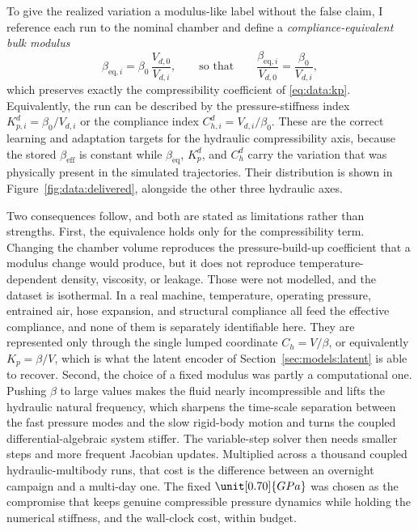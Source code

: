 To give the realized variation a modulus-like label without the false
claim, I reference each run to the nominal chamber and define a
\emph{compliance-equivalent bulk modulus}
%
\begin{equation}
  \label{eq:data:betaeq}
  \beta_{\mathrm{eq},i} = \beta_0\,\frac{V_{d,0}}{V_{d,i}},
  \qquad\text{so that}\qquad
  \frac{\beta_{\mathrm{eq},i}}{V_{d,0}} = \frac{\beta_0}{V_{d,i}},
\end{equation}
%
which preserves exactly the compressibility coefficient of
\eqref{eq:data:kp}. Equivalently, the run can be described by the
pressure-stiffness index $K_{p,i}^{d} = \beta_0/V_{d,i}$ or the
compliance index $C_{h,i}^{d} = V_{d,i}/\beta_0$. These are the correct
learning and adaptation targets for the hydraulic compressibility axis, because the stored $\beta_{\mathrm{eff}}$ is constant while
$\beta_{\mathrm{eq}}$, $K_p^{d}$, and $C_h^{d}$ carry the variation that
was physically present in the simulated trajectories. Their distribution
is shown in Figure~\ref{fig:data:delivered}, alongside the other three
hydraulic axes.

Two consequences follow, and both are stated as limitations rather than
strengths. First, the equivalence holds only for the compressibility
term. Changing the chamber volume reproduces the pressure-build-up
coefficient that a modulus change would produce, but it does not
reproduce temperature-dependent density, viscosity, or leakage. Those
were not modelled, and the dataset is isothermal. In a real machine,
temperature, operating pressure, entrained air, hose expansion, and
structural compliance all feed the effective compliance, and none of
them is separately identifiable here. They are represented only through
the single lumped coordinate $C_h = V/\beta$, or equivalently
$K_p = \beta/V$, which is what the latent encoder of
Section~\ref{sec:models:latent} is able to recover. Second, the choice
of a fixed modulus was partly a computational one. Pushing $\beta$ to
large values makes the fluid nearly incompressible and lifts the
hydraulic natural frequency, which sharpens the time-scale separation
between the fast pressure modes and the slow rigid-body motion and turns
the coupled differential-algebraic system stiffer. The variable-step
solver then needs smaller steps and more frequent Jacobian updates.
Multiplied across a thousand coupled hydraulic-multibody runs, that cost
is the difference between an overnight campaign and a multi-day one. The
fixed $\unit[0.70]{GPa}$ was chosen as the compromise that keeps genuine
compressible pressure dynamics while holding the numerical stiffness, and
the wall-clock cost, within budget.

